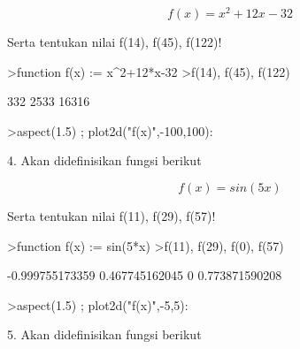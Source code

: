 \documentclass{article}
\begin{document}
\begin{eulernotebook}
\begin{eulercomment}
\begin{eulercomment}
\begin{eulercomment}
\end{eulercomment}
\begin{eulerformula}
\[
f(x) = x^2+12x-32
\]
\end{eulerformula}
\begin{eulerttcomment}
   Serta tentukan nilai f(14), f(45), f(122)!
\end{eulerttcomment}
\begin{eulerprompt}
>function f(x) := x^2+12*x-32
>f(14), f(45), f(122)
\end{eulerprompt}
\begin{euleroutput}
  332
  2533
  16316
\end{euleroutput}
\begin{eulerprompt}
>aspect(1.5) ; plot2d("f(x)",-100,100):
\end{eulerprompt}
\begin{eulercomment}
4. Akan didefinisikan fungsi berikut

\end{eulercomment}
\begin{eulerformula}
\[
f(x) = sin(5x)
\]
\end{eulerformula}
\begin{eulerttcomment}
   Serta tentukan nilai f(11), f(29), f(57)!
\end{eulerttcomment}
\begin{eulerprompt}
>function f(x) := sin(5*x)
>f(11), f(29), f(0), f(57)
\end{eulerprompt}
\begin{euleroutput}
  -0.999755173359
  0.467745162045
  0
  0.773871590208
\end{euleroutput}
\begin{eulerprompt}
>aspect(1.5) ; plot2d("f(x)",-5,5):
\end{eulerprompt}
\begin{eulercomment}
5. Akan didefinisikan fungsi berikut


\end{eulercomment}
\end{eulercomment}
\end{eulercomment}
\end{eulernotebook}
\end{document}
